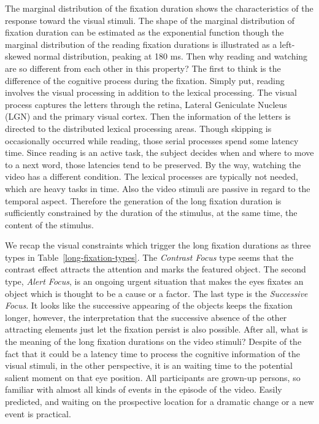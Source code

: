 \documentclass[10pt,letterpaper]{article}
\begin{document}
The marginal distribution of the fixation duration shows the characteristics of the response toward the visual stimuli. The shape of the marginal distribution of fixation duration can be estimated as the exponential function though the marginal distribution of the reading fixation durations is illustrated as a left-skewed normal distribution, peaking at 180 ms. Then why reading and watching are so different from each other in this property? The first to think is the difference of the cognitive process during the fixation. Simply put, reading involves the visual processing in addition to the lexical processing. The visual process captures the letters through the retina, Lateral Geniculate Nucleus (LGN) and the primary visual cortex. Then the information of the letters is directed to the distributed lexical processing areas. Though skipping is occasionally occurred while reading, those serial processes spend some latency time. Since reading is an active task, the subject decides when and where to move to a next word, those latencies tend to be preserved. By the way, watching the video has a different condition. The lexical processes are typically not needed, which are heavy tasks in time. Also the video stimuli are passive in regard to the temporal aspect. Therefore the generation of the long fixation duration is sufficiently constrained by the duration of the stimulus, at the same time, the content of the stimulus. 

We recap the visual constraints which trigger the long fixation durations as three types in Table~\ref{long-fixation-types}. The \textit{Contrast Focus} type seems that the contrast effect attracts the attention and marks the featured object. The second type, \textit{Alert Focus}, is an ongoing urgent situation that makes the eyes fixates an object which is thought to be a cause or a factor. The last type is the \textit{Successive Focus}. It looks like the successive appearing of the objects keeps the fixation longer, however, the interpretation that the successive absence of the other attracting elements just let the fixation persist is also possible. After all, what is the meaning of the long fixation durations on the video stimuli? Despite of the fact that it could be a latency time to process the cognitive information of the visual stimuli, in the other perspective, it is an waiting time to the potential salient moment on that eye position. All participants are grown-up persons, so familiar with almost all kinds of events in the episode of the video. Easily predicted, and waiting on the prospective location for a dramatic change or a new event is practical.
\end{document}
